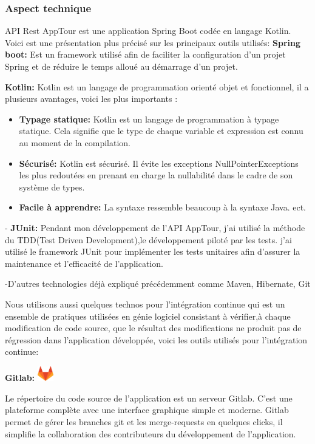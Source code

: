 \documentclass[12pt]{article}
\begin{document}
\subsubsection{Aspect technique}

API Rest AppTour est une application Spring Boot codée en langage Kotlin. Voici est une présentation plus précisé sur les principaux  
outils utilisés: 
\textbf{Spring boot:} Est un framework utilisé afin de faciliter la configuration d'un projet Spring et de réduire le temps alloué au démarrage d'un projet.

\textbf{Kotlin:} Kotlin est un langage de programmation orienté objet et fonctionnel, il a plusieurs avantages, voici les plus importants :
\begin{itemize}
\item \textbf{Typage statique: } Kotlin est un langage de programmation à typage statique. Cela signifie que le type de chaque variable et expression est connu au moment de la compilation.
\item \textbf{Sécurisé: } Kotlin est sécurisé. Il évite les exceptions NullPointerExceptions les plus redoutées en prenant en charge la nullabilité dans le cadre de son système de types.
\item \textbf{Facile à apprendre: } La syntaxe ressemble beaucoup à la syntaxe Java.
ect.
\end{itemize} 

- \textbf{JUnit:} Pendant mon développement de l'API AppTour, j'ai utilisé la méthode du TDD(Test Driven Development),le développement piloté par les tests. j'ai utilisé le framework JUnit pour implémenter les tests unitaires afin d'assurer la maintenance et l'efficacité de l’application.

-D'autres technologies déjà expliqué précédemment comme Maven, Hibernate, Git

Nous utilisons aussi quelques technos pour l'intégration continue qui est un ensemble de pratiques utilisées en génie logiciel consistant à vérifier,à chaque modification de code source, que le résultat des modifications ne produit pas de régression dans l’application développée, voici les outils utilisés pour l'intégration continue: 

\textbf{Gitlab:} \includegraphics[width=7mm,scale=0.5]{diagrammes/gitlab.png}

Le répertoire du code source de l’application est un serveur Gitlab. C’est une plateforme complète avec une interface graphique simple et moderne. Gitlab permet de gérer les branches git et les merge-requests en quelques clicks, il simplifie la collaboration des contributeurs du développement de l’application. 
\end{document}
